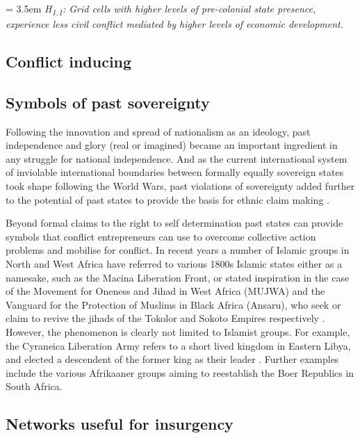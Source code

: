 \documentclass[12pt]{article}
\begin{document}
\bigskip

\hangindent = 3.5em \textit{H\textsubscript{1.1}: Grid cells with higher levels
of pre-colonial state presence, experience less civil conflict mediated by
higher levels of economic development.} 

\bigskip

\subsection{Conflict inducing}

\subsection{Symbols of past sovereignty}

Following the innovation and spread of nationalism as an ideology, past
independence and glory (real or imagined) became an important ingredient in any
struggle for national independence. And as the current international system of
inviolable international boundaries between formally equally sovereign states
took shape following the World Wars, past violations of sovereignty added
further to the potential of past states to provide the basis for ethnic claim
making \citep{Ahram2019, Shelef2016}. 

Beyond formal claims to the right to self determination past states can provide
symbols that conflict entrepreneurs can use to overcome collective action
problems and mobilise for conflict. In recent years a number of Islamic groups
in North and West Africa have referred to various 1800s Islamic states either as
a namesake, such as the Macina Liberation Front, or stated inspiration in the
case of the Movement for Oneness and Jihad in West Africa (MUJWA) and the
Vanguard for the Protection of Muslims in Black Africa (Ansaru), who seek or
claim to revive the jihads of the Tokolor and Sokoto Empires respectively
\citep{Zenn2015}. However, the phenomenon is clearly not limited to Islamist
groups. For example, the Cyraneica Liberation Army refers to a short lived
kingdom in Eastern Libya, and elected a descendent of the former king as their
leader \citep{Ahram2019}. Further examples include the various Afrikaaner groups
aiming to reestablish the Boer Republics in South Africa.

\subsection{Networks useful for insurgency}
\end{document}
